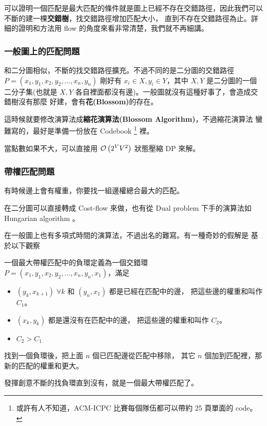 \documentclass[a4paper,12pt]{book}
\begin{document}
\begin{figure}[H]
  \centering
  
\end{figure}

可以證明一個匹配是最大匹配的條件就是圖上已經不存在交錯路徑，因此我們可以
不斷的建一棵{\bf 交錯樹}，找交錯路徑增加匹配大小，
直到不存在交錯路徑為止。詳細的證明和方法用
flow 的角度來看非常清楚，我們就不再細講。

\subsubsection{一般圖上的匹配問題}
和二分圖相似，不斷的找交錯路徑擴充。不過不同的是二分圖的交錯路徑 \\
$P = (x_1, y_1, x_2, y_2, \dots, x_n, y_n)$ 剛好有 
$x_i \in X, y_i \in Y$，其中 $X, Y$ 是二分圖的一個二分子集(也就是
$X, Y$ 各自裡面都沒有邊)。一般圖就沒有這種好事了，會造成交錯樹沒有那麼
好建，會有{\bf 花(Blossom)}的存在。

這時候就要修改演算法成{\bf 縮花演算法(Blossom Algorithm)}，不過縮花演算法
蠻難寫的，最好是準備一份放在 Codebook 
\footnote{或許有人不知道，ACM-ICPC 比賽每個隊伍都可以帶約 25 頁單面的 code。}
裡。

當點數如果不大，可以直接用 $\operatorname{\mathcal{O}}\left(2^V V^2\right)$ 狀態壓縮 DP 來解。

\subsubsection{帶權匹配問題}
有時候邊上會有權重，你要找一組邊權總合最大的匹配。

在二分圖可以直接轉成 Cost-flow 來做，也有從 Dual problem 下手的演算法如
Hungarian algorithm 。

在一般圖上也有多項式時間的演算法，不過出名的難寫。有一種奇妙的假解是
基於以下觀察
\begin{theorem}[定義]
  一個最大帶權匹配中的負環定義為一個交錯環\\
  $P = (x_1, y_1, x_2, y_2, \dots, x_n, y_n, x_1)$，滿足
  \begin{itemize}
    \item $(y_k, x_{k+1}) \; \forall k$ 和 $(y_n, x_1)$ 都是已經在匹配中的邊，
      把這些邊的權重和叫作 $C_1$。
    \item $(x_k, y_{k})$ 都是還沒有在匹配中的邊，
      把這些邊的權重和叫作 $C_2$。
    \item $C_2 > C_1$
  \end{itemize}
  找到一個負環後，把上面 $n$ 個已匹配邊從匹配中移除，
  其它 $n$ 個加到匹配裡，那新的匹配的權重和更大。
\end{theorem}
發揮創意不斷的找負環直到沒有，就是一個最大帶權匹配了。
\end{document}
